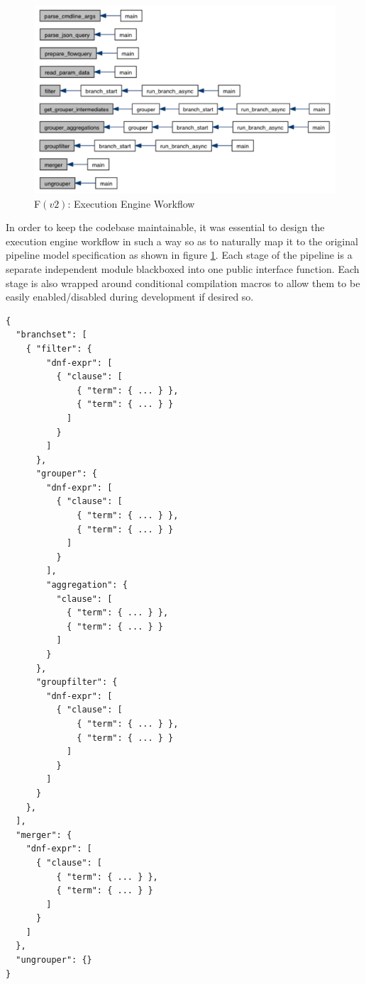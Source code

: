\begin{figure}[h!]
  \begin{center}
    \includegraphics* [width=1.0\linewidth]{figures/engine-workflow}
    \caption{F$(v2)$: Execution Engine Workflow}
    \label{fig:engine-workflow}
  \end{center}
\end{figure}

In order to keep the codebase maintainable, it was essential to design the
execution engine workflow in such a way so as to naturally map it to the
original pipeline model specification \cite{vmarinov:2009} as shown in figure
\ref{fig:engine-workflow}. Each stage of the pipeline is a separate
independent module blackboxed into one public interface function. Each stage
is also wrapped around conditional compilation macros to allow them to be
easily enabled/disabled during development if desired so.

\begin{lstlisting}
{
  "branchset": [
    { "filter": {
        "dnf-expr": [
          { "clause": [
              { "term": { ... } },
              { "term": { ... } }
            ]
          }
        ]
      },
      "grouper": {
        "dnf-expr": [
          { "clause": [
              { "term": { ... } },
              { "term": { ... } }
            ]
          }
        ],
        "aggregation": {
          "clause": [
            { "term": { ... } },
            { "term": { ... } }
          ]
        }
      },
      "groupfilter": {
        "dnf-expr": [
          { "clause": [
              { "term": { ... } },
              { "term": { ... } }
            ]
          }
        ]
      }
    },
  ],
  "merger": {
    "dnf-expr": [
      { "clause": [
          { "term": { ... } },
          { "term": { ... } }
        ]
      }
    ]
  },
  "ungrouper": {}
}
\end{lstlisting}

